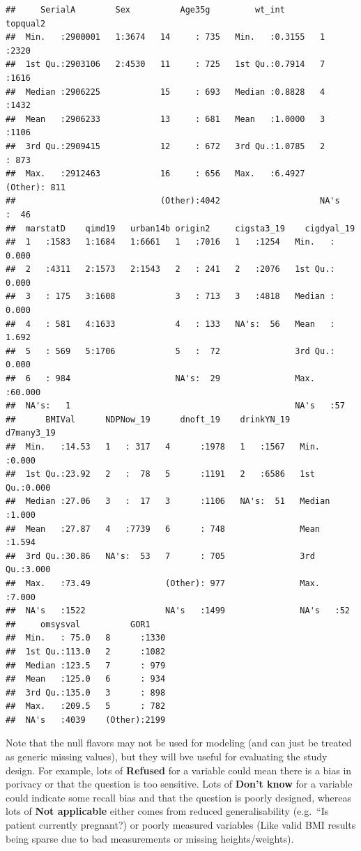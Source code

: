 \documentclass[
  11pt,
]{article}
\begin{document}
\begin{verbatim}
##     SerialA        Sex          Age35g         wt_int          topqual2   
##  Min.   :2900001   1:3674   14     : 735   Min.   :0.3155   1      :2320  
##  1st Qu.:2903106   2:4530   11     : 725   1st Qu.:0.7914   7      :1616  
##  Median :2906225            15     : 693   Median :0.8828   4      :1432  
##  Mean   :2906233            13     : 681   Mean   :1.0000   3      :1106  
##  3rd Qu.:2909415            12     : 672   3rd Qu.:1.0785   2      : 873  
##  Max.   :2912463            16     : 656   Max.   :6.4927   (Other): 811  
##                             (Other):4042                    NA's   :  46  
##  marstatD    qimd19   urban14b origin2     cigsta3_19    cigdyal_19    
##  1   :1583   1:1684   1:6661   1   :7016   1   :1254   Min.   : 0.000  
##  2   :4311   2:1573   2:1543   2   : 241   2   :2076   1st Qu.: 0.000  
##  3   : 175   3:1608            3   : 713   3   :4818   Median : 0.000  
##  4   : 581   4:1633            4   : 133   NA's:  56   Mean   : 1.692  
##  5   : 569   5:1706            5   :  72               3rd Qu.: 0.000  
##  6   : 984                     NA's:  29               Max.   :60.000  
##  NA's:   1                                             NA's   :57      
##      BMIVal      NDPNow_19      dnoft_19    drinkYN_19    d7many3_19   
##  Min.   :14.53   1   : 317   4      :1978   1   :1567   Min.   :0.000  
##  1st Qu.:23.92   2   :  78   5      :1191   2   :6586   1st Qu.:0.000  
##  Median :27.06   3   :  17   3      :1106   NA's:  51   Median :1.000  
##  Mean   :27.87   4   :7739   6      : 748               Mean   :1.594  
##  3rd Qu.:30.86   NA's:  53   7      : 705               3rd Qu.:3.000  
##  Max.   :73.49               (Other): 977               Max.   :7.000  
##  NA's   :1522                NA's   :1499               NA's   :52     
##     omsysval          GOR1     
##  Min.   : 75.0   8      :1330  
##  1st Qu.:113.0   2      :1082  
##  Median :123.5   7      : 979  
##  Mean   :125.0   6      : 934  
##  3rd Qu.:135.0   3      : 898  
##  Max.   :209.5   5      : 782  
##  NA's   :4039    (Other):2199
\end{verbatim}

Note that the null flavors may not be used for modeling (and can just be
treated as generic missing values), but they will bve useful for
evaluating the study design. For example, lots of \textbf{Refused} for a
variable could mean there is a bias in porivacy or that the question is
too sensitive. Lots of \textbf{Don't know} for a variable could indicate
some recall bias and that the question is poorly designed, whereas lots
of \textbf{Not applicable} either comes from reduced generalisability
(e.g.~``Is patient currently pregnant?) or poorly measured variables
(Like valid BMI results being sparse due to bad measurements or missing
heights/weights).
\end{document}
